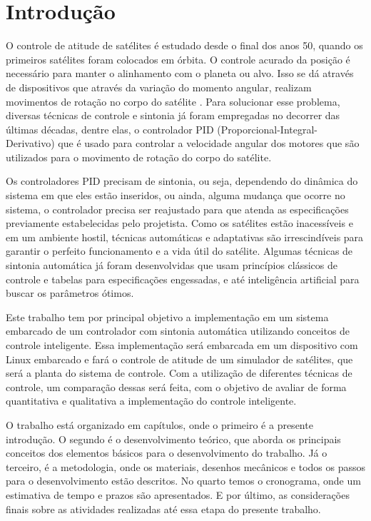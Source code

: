 \chapter[Introdução]{Introdução}

O controle de atitude de satélites é estudado desde o final dos anos 50, quando os primeiros satélites foram colocados em órbita. O controle acurado da posição é necessário para manter o alinhamento com o planeta ou alvo. Isso se dá através de dispositivos que através da variação do momento angular, realizam movimentos de rotação no corpo do satélite . Para solucionar esse problema, diversas técnicas de controle e sintonia já foram empregadas no decorrer das últimas décadas, dentre elas, o controlador PID (Proporcional-Integral-Derivativo) que é usado para controlar a velocidade angular dos motores que são utilizados para o movimento de rotação do corpo do satélite.

Os controladores PID precisam de sintonia, ou seja, dependendo do dinâmica do sistema em que eles estão inseridos, ou ainda, alguma mudança que ocorre no sistema, o controlador precisa ser reajustado para que atenda as especificações previamente estabelecidas pelo projetista. Como os satélites estão inacessíveis e em um ambiente hostil, técnicas automáticas e adaptativas são irrescindíveis para garantir o perfeito funcionamento e a vida útil do satélite. Algumas técnicas de sintonia automática já foram desenvolvidas que usam princípios clássicos de controle e tabelas para especificações engessadas, e até inteligência artificial para buscar os parâmetros ótimos.


Este trabalho tem por principal objetivo a implementação em um sistema embarcado de um controlador com sintonia automática utilizando conceitos de controle inteligente. Essa implementação será embarcada em um dispositivo com Linux embarcado e fará o controle de atitude de um simulador de satélites, que será a planta do sistema de controle. Com a utilização de diferentes técnicas de controle, um comparação dessas será feita, com o objetivo de avaliar de forma quantitativa e qualitativa a implementação do controle inteligente.

O trabalho está organizado em capítulos, onde o primeiro é a presente introdução. O segundo é o desenvolvimento teórico, que aborda os principais conceitos dos elementos básicos para o desenvolvimento do trabalho. Já o terceiro, é a metodologia, onde os materiais, desenhos mecânicos e todos os passos para o desenvolvimento estão descritos. No quarto temos o cronograma, onde um estimativa de tempo e prazos são apresentados. E por último, as considerações finais sobre as atividades realizadas até essa etapa do presente trabalho.











